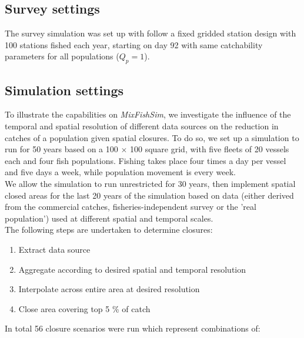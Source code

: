 \documentclass[review]{elsarticle}
\begin{document}
\subsection{Survey settings}

The survey simulation was set up with follow a fixed gridded station design
with 100 stations fished each year, starting on day 92  with same catchability parameters for
all populations ($Q_{p} = 1$). 

\subsection{Simulation settings}

To illustrate the capabilities on \emph{MixFishSim}, we investigate the
influence of the temporal and spatial resolution of different data sources on
the reduction in catches of a population given spatial closures. To do so, we
set up a simulation to run for 50 years based on a 100 $\times$ 100 square
grid, with five fleets of 20 vessels each and four fish populations. Fishing
takes place four times a day per vessel and five days a week, while population
movement is every week. \\

We allow the simulation to run unrestricted for 30 years,
then implement spatial closed areas for the last 20 years of the simulation
based on data (either derived from the commercial catches,
fisheries-independent survey or the 'real population') used at different
spatial and temporal scales. \\

The following steps are undertaken to determine closures:
\begin{enumerate}
	\item Extract data source
	\item Aggregate according to desired spatial and temporal resolution
	\item Interpolate across entire area at desired resolution
	\item Close area covering top 5 \% of catch 
\end{enumerate}
In total 56 closure scenarios were run which represent combinations of:
\end{document}
